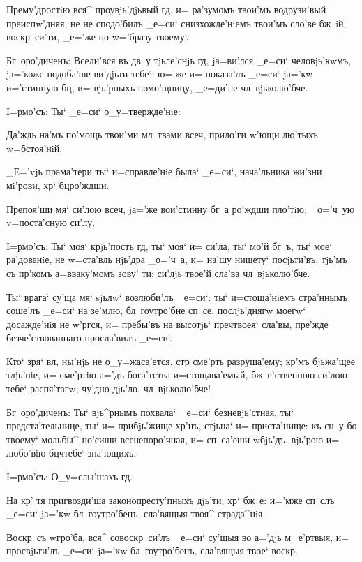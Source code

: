Прему'дростiю вся^ проувjь'дjьвый гд, и= ра'зумомъ 
твои'мъ водрузи'вый преиспw'дняя, не не сподо'билъ _е=си` 
снизхожде'нiемъ твои'мъ сло'ве бж~iй, воскр~си'ти, _е='же 
по w='бразу твоему`.

Бг~оро'диченъ: Всели'вся въ дв~у тjьле'снjь гд, 
jа=ви'лся _е=си` человjь'кwмъ, jа='коже подоба'ше 
ви'дjьти тебе`: ю='же и= показа'лъ _е=си` jа='кw 
и='стинную бц, и= вjь'рныхъ помо'щницу, _е=ди'не 
чл~вjьколю'бче.

 I=рмо'съ: Ты` _е=си` о_у=твержде'нiе:

Да'ждь на'мъ по'мощь твои'ми мл~твами всеч, 
прило'ги w'ющи лю'тыхъ w=бстоя'нiй.

_Е='vjь прама'тери ты` и=справле'нiе была` _е=си`, 
нача'льника жи'зни мi'рови, хр` бц ро'ждши.

Препоя'ши мя` си'лою всеч, jа='же вои'стинну бг~а 
ро'ждши пло'тiю, _о='ч~ую v=поста'сную си'лу.


I=рмо'съ: Ты` моя` крjь'пость гд, ты` моя` и= 
си'ла, ты` мо'й бг~ъ, ты` мое` ра'дованiе, не w=ста'вль 
нjь'дра _о='ч~а, и= на'шу нищету` посjьти'въ. тjь'мъ съ 
пр'комъ а=вваку'момъ зову' ти: си'лjь твое'й сла'ва 
чл~вjьколю'бче.

Ты` врага` су'ща мя` sjьлw` возлюби'лъ _е=си`: ты` 
и=стоща'нiемъ стра'ннымъ соше'лъ _е=си` на зе'млю, 
бл~гоутро'бне сп~се, послjь'днягw моегw` досажде'нiя не 
w'ргся, и= пребы'въ на высотjь` преч твоея` 
сла'вы, пре'жде безче'ствованнаго просла'вилъ _е=си`.

Кто` зря` вл, ны'нjь не о_у=жаса'ется, стр 
сме'рть разруша'ему; кр'мъ бjьжа'щее тлjь'нiе, и= 
сме'ртiю а='дъ бога'тства и=стощава'емый, бж~е'ственною 
си'лою тебе` распя'тагw; чу'дно дjь'ло, чл~вjьколю'бче!

Бг~оро'диченъ: Ты` вjь^рнымъ похвала` _е=си` 
безневjь'стная, ты` предста'тельнице, ты` и= прибjь'жище 
хр'нъ, стjьна` и= приста'нище: къ сн~у бо твоему` 
мольбы^ но'сиши всенепоро'чная, и= сп~са'еши w\т бjь'дъ, 
вjь'рою и= любо'вiю бц ч тебе` зна'ющихъ.

 I=рмо'съ: О_у=слы'шахъ гд.

На кр' тя пригвозди'ша законопресту'пныхъ дjь'ти, 
хр` бж~е: и='мже сп~слъ _е=си` jа='кw бл~гоутро'бенъ, 
сла'вящыя твоя^ страда^нiя.

Воскр~съ w\т гро'ба, вся^ совоскр~си'лъ _е=си` су'щыя 
во а='дjь м_е'ртвыя, и= просвjьти'лъ _е=си` jа='кw 
бл~гоутро'бенъ, сла'вящыя твое` воскр.

